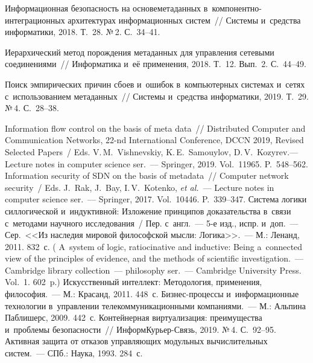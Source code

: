 \begin{multicols}{2}
{{\begin{thebibliography}{99}
 Информационная безопасность на основе\linebreak метаданных в~компонентно-интеграционных 
архитектурах информационных систем~// Системы и~средства информатики, 2018. Т.~28. 
№\,2. С.~34--41.
 
 Иерархический метод порождения 
метаданных для управления сетевыми соединениями~// Информатика и~её применения, 
2018. Т.~12. Вып.~2. С.~44--49. 

 Поиск эмпирических 
причин сбоев и~ошибок в~компьютерных системах и~сетях с~использованием 
метаданных~// Системы и~средства информатики, 2019. Т.~29. №\,4. С.~28--38.


 Information flow control on the basis of meta data~// 
Distributed Computer and Communication Networks, 22-nd International Conference, DCCN 2019, 
Revised Selected Papers~/ Eds. V.\,M.~Vishnevskiy, K.\,E.~Samouylov, 
D.\,V.~Kozyrev.--- Lecture 
notes in computer science ser.~--- Springer, 2019. Vol.~11965. P.~548--562.
 Information security of SDN 
on the basis of metadata~// Computer network security~/ Eds. J.~Rak, J.~Bay, I.\,V.~Kotenko, 
\textit{et al.}~--- Lecture notes in computer science ser.~--- Springer, 2017. Vol.~10446.  
P.~339--347.
 Система логики силлогической и~индуктивной: Изложение принципов 
доказательства в~связи с~методами научного исследования~/ 
Пер. с~англ.~--- 5-е изд., испр. 
и~доп.~--- Сер.\ <<Из наследия мировой философской мысли: Логика>>.~--- 
М.: Ленанд, 2011. 832~с. 
( A~system of logic, ratiocinative and inductive: Being a~connected view of 
the principles of evidence, and the methods of scientific investigation.~--- 
Cambridge library collection~--- philosophy ser.~--- 
Cambridge University Press. Vol.~1.   602~p.)
 Искусственный интеллект: Методология, применения, философия.~--- М.: 
Красанд, 2011. 448~с.
 Бизнес-про\-цес\-сы и~информационные 
технологии в~управлении телекоммуникационными компаниями.~--- М.: Альпина 
Паблишерс, 2009. 442~с.
 Контейнерная виртуализация: преимущества и~проблемы 
безопасности~// ИнформКурьер-Связь, 2019. №\,4.  
С.~92--95.
 Активная защита от 
отказов управляющих модульных вычислительных систем.~--- СПб.: Наука, 1993. 284~с.
\end{thebibliography}

 }
 }

\end{multicols}

